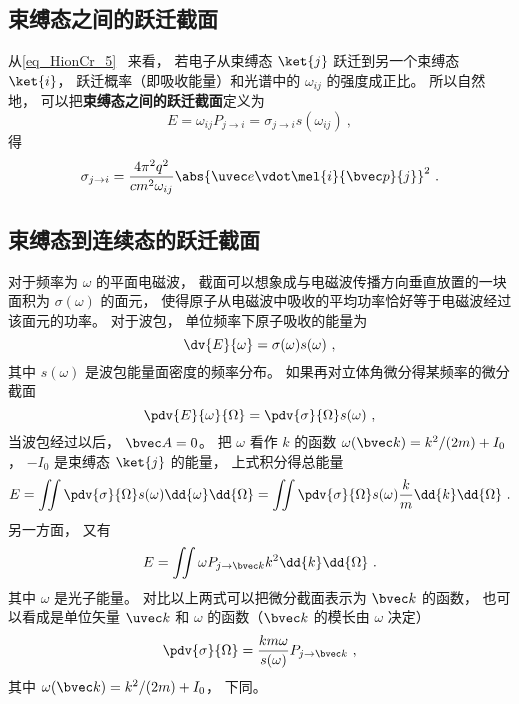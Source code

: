
\begin{issues}
\issueDraft
\end{issues}


\subsection{束缚态之间的跃迁截面}
从\autoref{eq_HionCr_5}~ 来看， 若电子从束缚态 $\ket{j}$ 跃迁到另一个束缚态 $\ket{i}$， 跃迁概率（即吸收能量）和光谱中的 $\omega_{ij}$ 的强度成正比。 所以自然地， 可以把\textbf{束缚态之间的跃迁截面}定义为
\begin{equation}
E = \omega_{ij}P_{j\to i} = \sigma_{j\to i} s(\omega_{ij})~,
\end{equation}
得 %
\begin{equation}
\sigma_{j\to i} = \frac{4\pi^2 q^2}{c m^2 \omega_{ij}} \abs{\uvec e \vdot\mel{i}{\bvec p}{j}}^2~.
\end{equation}

\subsection{束缚态到连续态的跃迁截面}
对于频率为 $\omega$ 的平面电磁波， 截面可以想象成与电磁波传播方向垂直放置的一块面积为 $\sigma(\omega)$ 的面元， 使得原子从电磁波中吸收的平均功率恰好等于电磁波经过该面元的功率。 对于波包， 单位频率下原子吸收的能量为
\begin{equation}
\dv{E}{\omega} = \sigma(\omega) s(\omega)~,
\end{equation}
其中 $s(\omega)$ 是波包能量面密度的频率分布。 如果再对立体角微分得某频率的微分截面 %
\begin{equation}
\pdv{E}{\omega}{\Omega} = \pdv{\sigma}{\Omega} s(\omega)~,
\end{equation}
当波包经过以后， $\bvec A = 0$。 把 $\omega$ 看作 $k$ 的函数 $\omega(\bvec k) = k^2/(2m) + I_0$， $-I_0$ 是束缚态 $\ket{j}$ 的能量， 上式积分得总能量
\begin{equation}
E = \iint \pdv{\sigma}{\Omega} s(\omega) \dd{\omega}\dd{\Omega} = \iint \pdv{\sigma}{\Omega} s(\omega) \frac{k}{m}\dd{k}\dd{\Omega}~.
\end{equation}
另一方面， 又有
\begin{equation}
E = \iint \omega P_{j\to {\bvec k}} k^2 \dd{k}\dd{\Omega}~.
\end{equation}
其中 $\omega$ 是光子能量。 对比以上两式可以把微分截面表示为 $\bvec k$ 的函数， 也可以看成是单位矢量 $\uvec k$ 和 $\omega$ 的函数（$\bvec k$ 的模长由 $\omega$ 决定）
\begin{equation}
\pdv{\sigma}{\Omega} = \frac{km \omega}{s(\omega)} P_{j\to \bvec k}~,
\end{equation}
其中 $\omega(\bvec k) = k^2/(2m) + I_0$， 下同。

